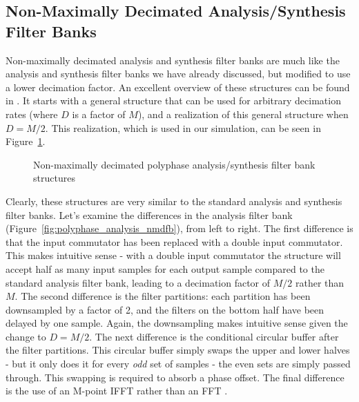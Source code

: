 \documentclass[12pt]{article}
\begin{document}
\subsection{Non-Maximally Decimated Analysis/Synthesis Filter Banks}
Non-maximally decimated analysis and synthesis filter banks are much like the
analysis and synthesis filter banks we have already discussed, but modified to
use a lower decimation factor. An excellent overview of these structures can be
found in \cite{Chen1}. It starts with a general structure that can be used for
arbitrary decimation rates (where $D$ is a factor of $M$), and a realization of
this general structure when $D=M/2$.  This realization, which is used in our
simulation, can be seen in Figure~\ref{fig:poly_analysis_synthesis_nmdfb}.

\begin{figure}[h!]
\centerline{
    \hfill
}

\caption{Non-maximally decimated polyphase analysis/synthesis filter bank structures}
\label{fig:poly_analysis_synthesis_nmdfb}
\end{figure}

Clearly, these structures are very similar to the standard analysis and
synthesis filter banks. Let's examine the differences in the analysis filter
bank (Figure~\ref{fig:polyphase_analysis_nmdfb}), from left to right. The first
difference is that the input commutator has been replaced with a double input
commutator. This makes intuitive sense - with a double input commutator the
structure will accept half as many input samples for each output sample
compared to the standard analysis filter bank, leading to a decimation factor
of $M/2$ rather than $M$. The second difference is the filter partitions: each
partition has been downsampled by a factor of 2, and the filters on the bottom
half have been delayed by one sample.  Again, the downsampling makes intuitive
sense given the change to $D=M/2$. The next difference is the conditional
circular buffer after the filter partitions. This circular buffer simply swaps
the upper and lower halves - but it only does it for every \emph{odd} set of
samples - the even sets are simply passed through. This swapping is required to
absorb a phase offset. The final difference is the use of an M-point IFFT
rather than an FFT \cite{Chen1}.
\end{document}

